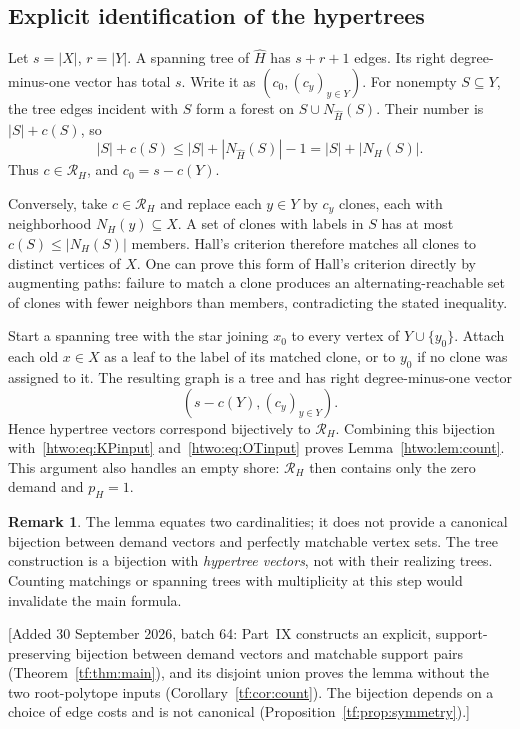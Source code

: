 \documentclass[11pt]{article}
\numberwithin{equation}{section}
\theoremstyle{definition}
\newtheorem{remark}[theorem]{Remark}
\begin{document}
\subsection{Explicit identification of the hypertrees}

Let $s=|X|$, $r=|Y|$. A spanning tree of $\widehat H$ has $s+r+1$ edges.
Its right degree-minus-one vector has total $s$. Write it as
$(c_0,(c_y)_{y\in Y})$. For nonempty $S\subseteq Y$, the tree edges
incident with $S$ form a forest on
$S\cup N_{\widehat H}(S)$. Their number is $|S|+c(S)$, so
\[
 |S|+c(S)\le |S|+|N_{\widehat H}(S)|-1
            =|S|+|N_H(S)|.
\]
Thus $c\in\mathcal R_H$, and $c_0=s-c(Y)$.

Conversely, take $c\in\mathcal R_H$ and replace each $y\in Y$ by $c_y$
clones, each with neighborhood $N_H(y)\subseteq X$. A set of clones with
labels in $S$ has at most $c(S)\le|N_H(S)|$ members. Hall's criterion
therefore matches all clones to distinct vertices of $X$. One can prove
this form of Hall's criterion directly by augmenting paths: failure to
match a clone produces an alternating-reachable set of clones with fewer
neighbors than members, contradicting the stated inequality.

Start a spanning tree with the star joining $x_0$ to every vertex of
$Y\cup\{y_0\}$. Attach each old $x\in X$ as a leaf to the label of its
matched clone, or to $y_0$ if no clone was assigned to it. The resulting
graph is a tree and has right degree-minus-one vector
\[
 (s-c(Y),(c_y)_{y\in Y}).
\]
Hence hypertree vectors correspond bijectively to $\mathcal R_H$.
Combining this bijection with~\eqref{htwo:eq:KPinput} and~\eqref{htwo:eq:OTinput}
proves Lemma~\ref{htwo:lem:count}. This argument also handles an empty shore:
$\mathcal R_H$ then contains only the zero demand and $p_H=1$.

\begin{remark}
The lemma equates two cardinalities; it does not provide a canonical
bijection between demand vectors and perfectly matchable vertex sets.
The tree construction is a bijection with \emph{hypertree vectors}, not
with their realizing trees. Counting matchings or spanning trees with
multiplicity at this step would invalidate the main formula.
\end{remark}
[Added 30 September 2026, batch 64: Part~IX constructs an explicit,
support-preserving bijection between demand vectors and matchable support
pairs (Theorem~\ref{tf:thm:main}), and its disjoint union proves the lemma
without the two root-polytope inputs (Corollary~\ref{tf:cor:count}). The
bijection depends on a choice of edge costs and is not canonical
(Proposition~\ref{tf:prop:symmetry}).]
\end{document}
